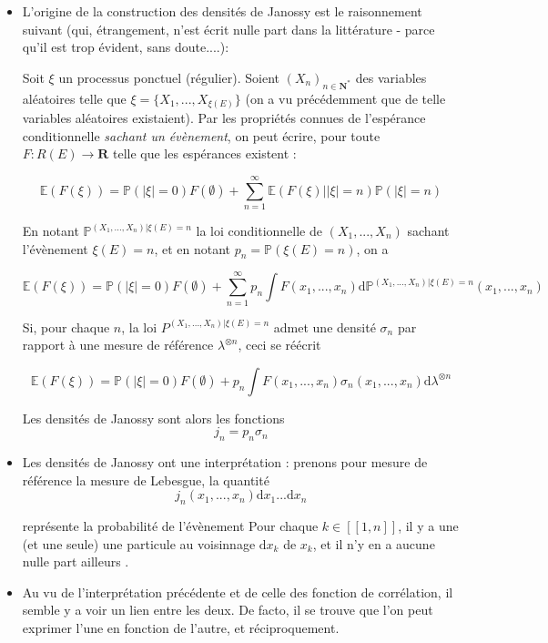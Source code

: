 \documentclass[12pt]{article}
\let\oldsum\sum
\renewcommand{\sum}{\oldsum\limits}
\begin{document}
\begin{itemize}

  \item L'origine de la construction des densités de Janossy est le raisonnement suivant (qui, étrangement, n'est écrit nulle part dans la littérature - parce qu'il est trop évident, sans doute....): 
  
  Soit $ \xi $ un processus ponctuel (régulier). Soient $(X_n)_{n \in \mathbf N^*} $ des variables aléatoires telle que $ \xi = \{X_1,...,X_{\xi(E)}\} $ (on a vu précédemment que de telle variables aléatoires existaient). Par les propriétés connues de l'espérance conditionnelle \textit{sachant un évènement}, on peut écrire, pour toute $ F : R(E) \to \mathbf R $ telle que les espérances existent :
  
  $$ \mathbb E(F(\xi)) = \mathbb P( |\xi| = 0) F(\emptyset) + \sum_{n=1}^\infty \mathbb E(F(\xi) | |\xi| = n ) \mathbb P(|\xi| = n) $$

  En notant $ \mathbb P^{(X_1,...,X_n) | \xi(E) = n} $ la loi conditionnelle de $ (X_1,...,X_n)$ sachant l'évènement $ \xi(E) = n $, et en notant $ p_n = \mathbb P( \xi(E) = n ) $, on a 

  $$ \mathbb E(F(\xi)) = \mathbb P( |\xi| = 0) F(\emptyset) + \sum_{n=1}^\infty p_n \int F(x_1,...,x_n) \mathrm d \mathbb P^{(X_1,...,X_n) | \xi(E) = n}(x_1,...,x_n) $$

  Si, pour chaque $n$, la loi $P^{(X_1,...,X_n) | \xi(E) = n}$ admet une densité $ \sigma_n $ par rapport à une mesure de référence $ \lambda^{\otimes n} $, ceci se réécrit 
  
  $$ \mathbb E(F(\xi)) = \mathbb P( |\xi| = 0) F(\emptyset) + p_n \int F(x_1,...,x_n) \sigma_n(x_1,...,x_n) \mathrm d \lambda^{\otimes n}$$

  Les densités de Janossy sont alors les fonctions $$ j_n = p_n \sigma_n $$

  \item Les densités de Janossy ont une interprétation : prenons pour mesure de référence la mesure de Lebesgue, la quantité $$ j_n(x_1,...,x_n) \mathrm dx_1 ... \mathrm d x_n $$ 
  
  représente la probabilité de l'évènement \og Pour chaque $ k \in [\![1,n]\!] $, il y a une (et une seule) une particule au voisinnage $\mathrm d x_k$ de $ x_k $, et il n'y en a aucune nulle part ailleurs \fg.

  \item Au vu de l'interprétation précédente et de celle des fonction de corrélation, il semble y a voir un lien entre les deux. De facto, il se trouve que l'on peut exprimer l'une en fonction de l'autre, et réciproquement.

\end{itemize}
\end{document}
